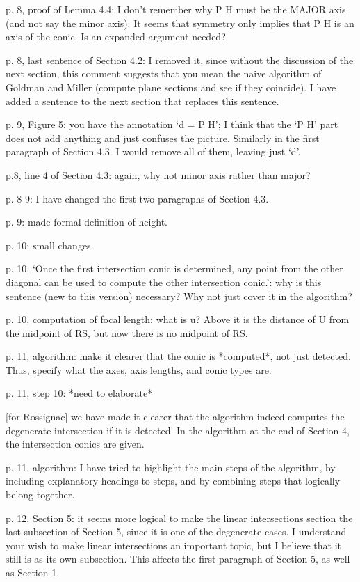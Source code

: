 p. 8, proof of Lemma 4.4: I don't remember why P \cap H must be the MAJOR
	axis (and not say the minor axis).
	It seems that symmetry only implies that P \cap H is an axis 
	of the conic.  Is an expanded argument needed?

p. 8, last sentence of Section 4.2: I removed it, since without
	the discussion of the next section, this comment suggests
	that you mean the naive algorithm of Goldman and Miller 
	(compute plane sections and see if they coincide).
	I have added a sentence to the next section that replaces
	this sentence.

p. 9, Figure 5: you have the annotation `d = P \cap H';
	I think that the `P \cap H' part does not add anything
	and just confuses the picture.
	Similarly in the first paragraph of Section 4.3.
	I would remove all of them, leaving just `d'.
	
p.8, line 4 of Section 4.3: again, why not minor axis rather than major?

p. 8-9: I have changed the first two paragraphs of Section 4.3.
	
p. 9: made formal definition of height.

p. 10: small changes.

p. 10, `Once the first intersection conic
	is determined, any point from the other diagonal can be used
	to compute the other intersection conic.':
	why is this sentence (new to this version) necessary?
	Why not just cover it in the algorithm?

p. 10, computation of focal length: what is u?  Above it is the distance
	of U from the midpoint of RS, but now there is no midpoint of RS.

p. 11, algorithm: make it clearer that the conic is *computed*, 
	not just detected.
	Thus, specify what the axes, axis lengths, and conic types are.

p. 11, step 10: *need to elaborate*

[for Rossignac]  we have made it clearer that the algorithm indeed computes
	the degenerate intersection if it is detected.
	In the algorithm at the end of Section 4, the intersection conics
	are given.

p. 11, algorithm: I have tried to highlight the main steps of the algorithm,
	by including explanatory headings to steps,
	and by combining steps that logically belong together.

p. 12, Section 5: it seems more logical to make the linear intersections
	section the last subsection of Section 5, since it is one
	of the degenerate cases.  I understand your wish to make linear
	intersections an important topic, but I believe that it still is
	as its own subsection.
	This affects the first paragraph of Section 5, as well as Section 1.

